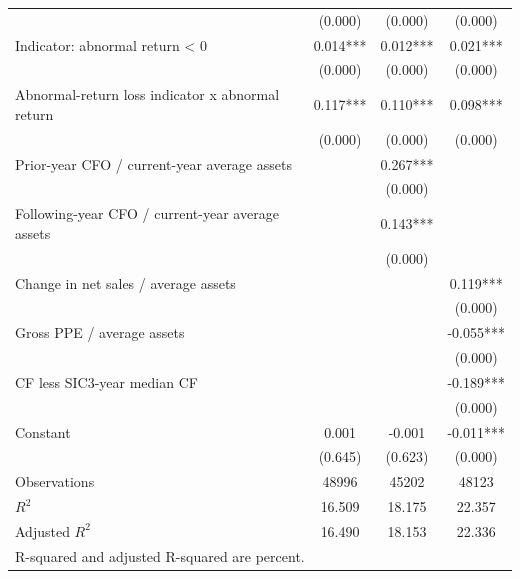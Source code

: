 {\begin{tabular}{l*{3}{c}}
                    &     (0.000)   &     (0.000)   &     (0.000)   \\
Indicator: abnormal return < 0&       0.014***&       0.012***&       0.021***\\
                    &     (0.000)   &     (0.000)   &     (0.000)   \\
Abnormal-return loss indicator x abnormal return&       0.117***&       0.110***&       0.098***\\
                    &     (0.000)   &     (0.000)   &     (0.000)   \\
Prior-year CFO / current-year average assets&               &       0.267***&               \\
                    &               &     (0.000)   &               \\
Following-year CFO / current-year average assets&               &       0.143***&               \\
                    &               &     (0.000)   &               \\
Change in net sales / average assets&               &               &       0.119***\\
                    &               &               &     (0.000)   \\
Gross PPE / average assets&               &               &      -0.055***\\
                    &               &               &     (0.000)   \\
CF less SIC3-year median CF&               &               &      -0.189***\\
                    &               &               &     (0.000)   \\
Constant            &       0.001   &      -0.001   &      -0.011***\\
                    &     (0.645)   &     (0.623)   &     (0.000)   \\
\hline
Observations        &       48996   &       45202   &       48123   \\
\(R^{2}\)           &      16.509   &      18.175   &      22.357   \\
Adjusted \(R^{2}\)  &      16.490   &      18.153   &      22.336   \\
\hline\hline
\multicolumn{4}{l}{\footnotesize R-squared and adjusted R-squared are percent.}\\
\end{tabular}
}
